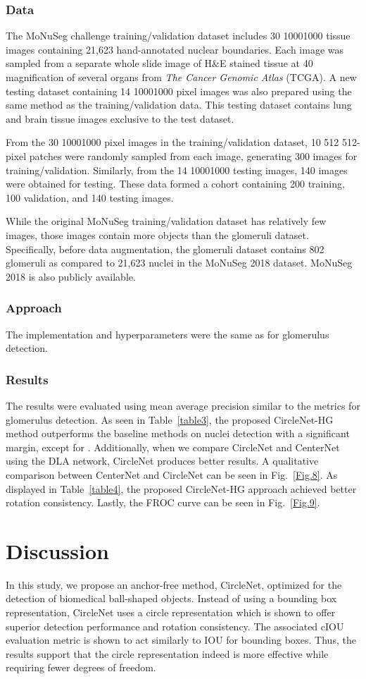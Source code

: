 \documentclass[journal]{IEEEtran}
\newcommand{\Fig}{Fig.}
\newcommand{\Tab}{Table}
\begin{document}
\subsubsection{Data}
The MoNuSeg challenge training/validation dataset includes 30 10001000 tissue images containing 21,623 hand-annotated nuclear boundaries. Each image was sampled from a separate whole slide image of H\&E stained tissue at 40 magnification of several organs from \emph{The Cancer Genomic Atlas} (TCGA). A new testing dataset containing 14 10001000 pixel images was also prepared using the same method as the training/validation data. This testing dataset contains lung and brain tissue images exclusive to the test dataset. 

From the 30 10001000 pixel images in the training/validation dataset, 10 512 512-pixel patches were randomly sampled from each image, generating 300 images for training/validation. Similarly, from the 14 10001000 testing images, 140 images were obtained for testing. These data formed a cohort containing 200 training, 100 validation, and 140 testing images. 

While the original MoNuSeg training/validation dataset has relatively few images, those images contain more objects than the glomeruli dataset. Specifically, before data augmentation, the glomeruli dataset contains 802 glomeruli as compared to 21,623 nuclei in the MoNuSeg 2018 dataset. MoNuSeg 2018 is also publicly available.
\subsubsection{Approach}
The implementation and hyperparameters were the same as for glomerulus detection. 

\subsubsection{Results}
The results were evaluated using mean average precision similar to the metrics for glomerulus detection. As seen in \Tab~\ref{table3}, the proposed CircleNet-HG method outperforms the baseline methods on nuclei detection with a significant margin, except for . Additionally, when we compare CircleNet and CenterNet using the DLA network, CircleNet produces better results. A qualitative comparison between CenterNet and CircleNet can be seen in \Fig~\ref{Fig.8}. As displayed in \Tab~\ref{table4}, the proposed CircleNet-HG approach achieved better rotation consistency. Lastly, the FROC curve can be seen in \Fig~\ref{Fig.9}.
\section{Discussion}
In this study, we propose an anchor-free method, CircleNet, optimized for the detection of biomedical ball-shaped objects. Instead of using a bounding box representation, CircleNet uses a circle representation which is shown to offer superior detection performance and rotation consistency. The associated cIOU evaluation metric is shown to act similarly to IOU for bounding boxes. Thus, the results support that the circle representation indeed is more effective while requiring fewer degrees of freedom.
\end{document}
